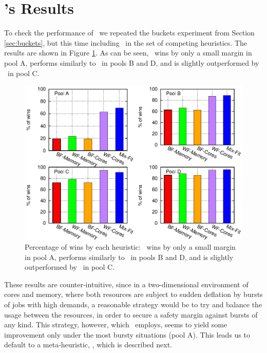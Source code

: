 \section{\mif's Results}

To check the performance of \mif\ we repeated the buckets 
experiment from Section \ref{sec:buckets}, 
but this time including \mif\ in the set of competing heuristics.
The results are shown in Figure \ref{fig:buckets-all}.
As can be seen, \mif\ wins by only a small margin in pool A, 
performs similarly to \wfc\ in pools B and D, and is slightly outperformed by \wfc\ 
in pool C.

\begin{figure}\centering
	\includegraphics[width=.9\textwidth]{figures/buckets-all.eps}
\caption{Percentage of wins by each heuristic: \mif\ wins by only a
  small margin in pool A, performs similarly to \wfc\ in pools B and
  D, and is slightly outperformed by \wfc\ in pool C.}
\label{fig:buckets-all}
\end{figure}

These results are counter-intuitive, since in a two-dimensional
environment of cores and memory, where both resources are subject to
sudden deflation by bursts of jobs with high demands, a reasonable
strategy would be to try and balance the usage between the resources,
in order to secure a safety margin against bursts of any kind.
This strategy, however, which \mif\ employs, seems to yield some
improvement only under the most bursty situations (pool A).
This leads us to default to a meta-heuristic, \maj, which is described
next.


